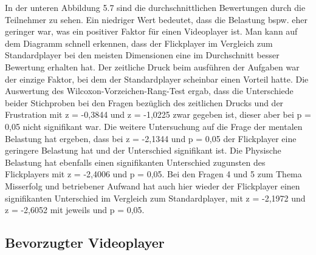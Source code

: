 \documentclass[11pt,a4paper]{report}
\begin{document}
In der unteren Abbildung 5.7 sind die durchschnittlichen Bewertungen durch die Teilnehmer zu sehen. Ein niedriger Wert bedeutet, dass die Belastung bspw. eher geringer war, was ein positiver Faktor für einen Videoplayer ist. Man kann auf dem Diagramm schnell erkennen, dass der Flickplayer im Vergleich zum Standardplayer bei den meisten Dimensionen eine im Durchschnitt besser Bewertung erhalten hat. Der zeitliche Druck beim ausführen der Aufgaben war der einzige Faktor, bei dem der Standardplayer scheinbar einen Vorteil hatte. Die Auswertung des Wilcoxon-Vorzeichen-Rang-Test ergab, dass die Unterschiede beider Stichproben bei den Fragen bezüglich des zeitlichen Drucks und der Frustration mit z = -0,3844 und z = -1,0225 zwar gegeben ist, dieser aber bei p = 0,05 nicht signifikant war. Die weitere Untersuchung auf die Frage der mentalen Belastung hat ergeben, dass bei z = -2,1344 und p = 0,05 der Flickplayer eine geringere Belastung hat und der Unterschied signifikant ist. Die Physische Belastung hat ebenfalls einen signifikanten Unterschied zugunsten des Flickplayers mit z = -2,4006 und p = 0,05. Bei den Fragen 4 und 5 zum Thema Misserfolg und betriebener Aufwand hat auch hier wieder der Flickplayer einen signifikanten Unterschied im Vergleich zum Standardplayer, mit z = -2,1972 und z = -2,6052 mit jeweils und p = 0,05.

\subsection{Bevorzugter Videoplayer}
\end{document}
